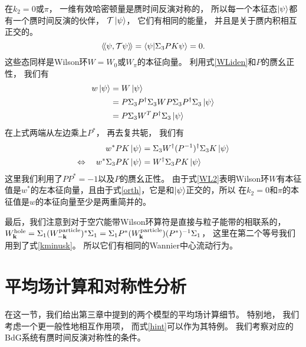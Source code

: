 在$k_2=0$或$\pi$，
一维有效哈密顿量是赝时间反演对称的，
所以每一个本征态$\ket{\psi}$都有一个赝时间反演的伙伴，
$\mathcal T\ket{\psi}$，
它们有相同的能量，
并且是关于赝内积相互正交的。
\begin{equation}\label{orth}
	\langle\!\langle \psi,\mathcal T \psi \rangle\!\rangle=\braket{\psi}{\Sigma_3 PK\psi}=0.
\end{equation}
这些态同样是Wilson环$W=W_{0}$或$W_\pi$的本征向量。
利用式\eqref{WLiden}和$P$的赝幺正性，
我们有
\begin{equation*}
	\begin{split}
		w\ket{\psi} &= W\ket{\psi}\\
		&= P\Sigma_3P^\dagger \Sigma_3 W P\Sigma_3P^\dagger \Sigma_3\ket{\psi}\\
		&= P\Sigma_3 W^T P^\dagger \Sigma_3 \ket{\psi}
	\end{split}
\end{equation*}
在上式两端从左边乘上$P^*$，
再去复共轭，
我们有
\begin{equation}\label{WL2}
	\begin{split}
		w^*PK\ket{\psi} &= \Sigma_3 W^\dagger (P^{-1})^\dagger \Sigma_3 K \ket{\psi}\\
		\Leftrightarrow\quad w^* \Sigma_3 PK\ket{\psi} & = W^\dagger \Sigma_3 PK\ket{\psi}
	\end{split}
\end{equation}
这里我们利用了$PP^*=-1$以及$P$的赝幺正性。
由于式\eqref{WL2}表明Wilson环$W$有本征值是$w^*$的左本征向量，且由于式\eqref{orth}，它是和$\ket{\psi}$正交的，所以 在$k_2=0$和$\pi$的本征值是$w$的本征向量至少是两重简并的。

最后，我们注意到对于空穴能带Wilson环算符是直接与粒子能带的相联系的，
$W^{\textnormal{hole}}_{\vb k}=\Sigma_1 (W_{-\vb k}^{\textnormal{particle}})^*\Sigma_1=\Sigma_1P^* (W_{\vb k}^{\textnormal{particle}})(P^{*})^{-1} \Sigma_1$，
这里在第二个等号我们用到了式\eqref{kminusk}。
所以它们有相同的Wannier中心流动行为。 

\section{平均场计算和对称性分析}
\label{mfs}
在这一节，我们给出第三章中提到的两个模型的平均场计算细节。
特别地，
我们考虑一个更一般性地相互作用项，
而式\eqref{hint}可以作为其特例。
我们考察对应的BdG系统有赝时间反演对称性的条件。
